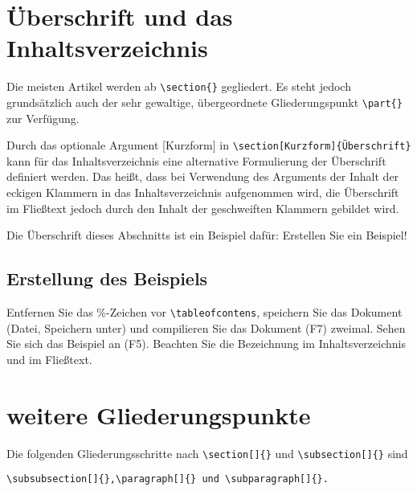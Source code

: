 \documentclass[a4paper,%
twoside,							%
headsepline=true,					%
footsepline=true,					%
headings=normal,
listof=totoc,					%
bibliography=totoc			%
]
{scrartcl}
\begin{document}
\section[Überschriften]{Überschrift und das Inhaltsverzeichnis}
Die meisten Artikel werden ab \verb#\section{}# gegliedert. Es steht jedoch grundsätzlich auch der sehr gewaltige, übergeordnete Gliederungspunkt \verb#\part{}# zur Verfügung.

Durch das optionale Argument [Kurzform] in \verb#\section[Kurzform]{Überschrift}# kann für das Inhaltsverzeichnis eine alternative Formulierung der Überschrift definiert werden. Das heißt, dass bei Verwendung des Arguments der Inhalt der eckigen Klammern in das Inhaltsverzeichnis aufgenommen wird, die Überschrift im Fließtext jedoch durch den Inhalt der geschweiften Klammern gebildet wird. 

Die Überschrift dieses Abschnitts ist ein Beispiel dafür: Erstellen Sie ein Beispiel!

\subsection{Erstellung des Beispiels}
Entfernen Sie das \%-Zeichen vor \verb#\tableofcontens#, speichern Sie das Dokument (Datei, Speichern unter) und compilieren Sie das Dokument (F7) zweimal. Sehen Sie sich das Beispiel an (F5). Beachten Sie die Bezeichnung im Inhaltsverzeichnis und im Fließtext.

\section{weitere Gliederungspunkte}
Die folgenden Gliederungsschritte nach \verb#\section[]{}# und \verb#\subsection[]{}# sind 
\begin{verbatim}
\subsubsection[]{},\paragraph[]{} und \subparagraph[]{}.
\end{verbatim}
\end{document}
